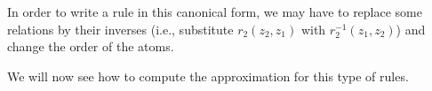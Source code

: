 In order to write a rule in this canonical form, we may have to replace some relations by their inverses
(i.e., substitute $r_2(z_2,z_1)$ with $r_2^{-1}(z_1,z_2)$) and change the order of the atoms.

We will now see how to compute the approximation for this type of rules.




% 
% 


